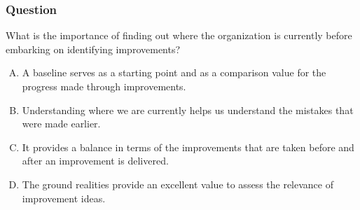 \documentclass[aspectratio=169, table]{beamer}
\begin{document}
	\begin{frame}
		\frametitle{Question}
		
		What is the importance of finding out where the organization is currently before embarking on identifying improvements?
		
		\begin{enumerate}[A.]
			\item A baseline serves as a starting point and as a comparison value for the progress made through improvements.
			\item Understanding where we are currently helps us understand the mistakes that were made earlier.
			\item It provides a balance in terms of the improvements that are taken before and after an improvement is delivered.
			\item The ground realities provide an excellent value to assess the relevance of improvement ideas.
		\end{enumerate}
		
	\end{frame}
\end{document}

